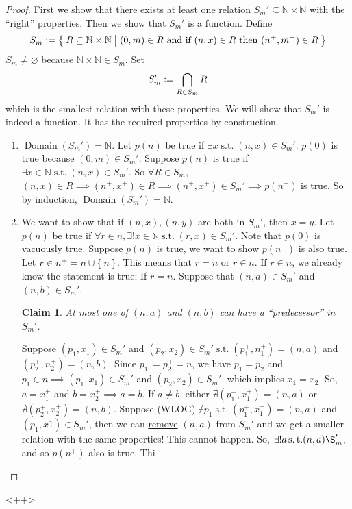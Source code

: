 \documentclass[12pt]{amsart}
\newcommand{\bbN}{\mathbb{N}}
\newcommand{\suchthat}{\operatorname{s.t.}}
\theoremstyle{plain}
\newtheorem*{claim}{Claim}
\theoremstyle{remark}
\theoremstyle{definition}
\begin{document}
\begin{proof}
	First we show that there exists at least one \ul{relation} $S_m' \subseteq \bbN \times \bbN$ with the ``right'' properties. Then we show that $S_m'$ is a function.
	Define 
	\begin{equation*}
		S_m \vcentcolon = \Set{R \subseteq \bbN \times \bbN | (0, m) \in R \text{ and if } (n,x) \in R \text{ then } (n^+, m^+)\in R}
	\end{equation*}
	$S_m \neq \varnothing$ because $\bbN \times \bbN \in S_m$. Set
	\begin{equation*}
		S_m' \vcentcolon = \bigcap\limits_{R\in S_m}R
	\end{equation*}
	which is the smallest relation with these properties. 
	\newline
	We will show that $S_m'$ is indeed a function. It has the required properties by construction.
	\begin{enumerate}[(1)]
	\item $\operatorname{Domain}(S_m') = \bbN$.
		\newline
		Let $p(n)$ be true if $\exists x \suchthat (n, x)\in S_m'$. $p(0)$ is true because $(0, m) \in S_m'$. 
		\newline
		Suppose $p(n)$ is true if $\exists x \in \bbN \suchthat (n, x) \in S_m'$. So $\forall R \in S_m$, $(n, x) \in R \implies (n^+, x^+) \in R \implies (n^+, x^+) \in S_m' \implies p(n^+)$ is true. So by induction, $\operatorname{Domain}(S_m') = \bbN$.
	\item We want to show that if $(n, x), (n, y)$ are both in $S_m'$, then $x = y$.
	\newline
	Let $p(n)$ be true if $\forall r \in n, \exists! x \in \bbN \suchthat (r, x) \in S_m'$. Note that $p(0)$ is vacuously true.
	\newline
	Suppose $p(n)$ is true, we want to show $p(n^+)$ is also true. Let $r \in n^+ = n \cup \Set{n}$. This means that $r = n $ or $ r \in n$.
	\newline
	If $r \in n$, we already know the statement is true; If $r = n$. Suppose that $(n, a) \in S_m'$ and $(n, b) \in S_m'$.
	\begin{claim}
		At most one of $(n,a)$ and $(n,b)$ can have a ``predecessor'' in $S_m'$. 
	\end{claim}
	Suppose $(p_1, x_1) \in S_m'$ and $(p_2, x_2) \in S_m' \suchthat (p_1^+, n_1^+) = (n, a)$ and $(p_2^+, n_2^+) = (n, b)$. Since $p_1^+ = p_2^+ = n$, we have $p_1 = p_2$ and $p_1 \in n \implies (p_1,x_1) \in S_m'$ and $(p_2, x_2) \in S_m'$, which implies $x_1 = x_2$.
	\newline
	So, $a = x_1^+$ and $b = x_2^+ \implies a = b$. If $a \neq b$, either $\nexists (p_1^+, x_1^+) = (n, a)$ or $\nexists (p_2^+, x_2^+) = (n, b)$.
	\newline
	Suppose (WLOG) $\nexists p_1 \suchthat (p_1^+, x_1^+) = (n, a)$ and $(p_1, x1) \in S_m'$, then we can \ul{remove} $(n, a)$ from $S_m'$ and we get a smaller relation with the same properties! This cannot happen.
	\newline
	So, $\exists! a \suchthat (n, a) \S_m'$, and so $p(n^+)$ also is true. Thi
	\end{enumerate}
\end{proof}<++>
\end{document}
